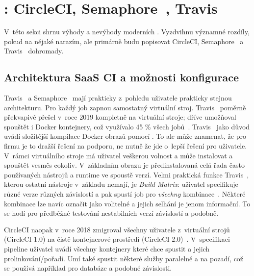 \newcommand{\circleci}{\xspace{}CircleCI\xspace}
\newcommand{\travis}{\xspace{}Travis~\glstext{CI}\xspace}
\newcommand{\semaphore}{\xspace{}Semaphore~\xspace}

\section{: \circleci, \semaphore, \travis}
    V~této sekci shrnu výhody a nevýhody moderních  \CI. Vyzdvihnu významné rozdíly, pokud na nějaké narazím, ale primárně budu popisovat \circleci, \semaphore a \travis dohromady.

    \subsection{Architektura SaaS CI a možnosti konfigurace}
        \travis a \semaphore mají prakticky z~pohledu uživatele prakticky stejnou architekturu. Pro každý job zapnou samostatný virtuální stroj. \travis poměrně překvapivě přešel v~roce 2019 kompletně na virtuální stroje; dříve umožňoval spouštět i Docker kontejnery, což využívalo 45 \% všech jobů~\cite{travis-arch}. \travis jako důvod uvádí složitější kompilace Docker obrazů pomocí . To ale může znamenat, že pro firmu je to dražší řešení na podporu, ne nutně že jde o~lepší řešení pro uživatele. V~rámci virtuálního stroje má uživatel veškerou volnost a může instalovat a spouštět vesměs cokoliv. V~základním obrazu je předinstalovaná celá řada často používaných nástrojů a runtime ve spoustě verzí. Velmi praktická funkce \travis, kterou ostatní \CI nástroje v~základu nemají, je \textit{Build Matrix}: uživatel specifikuje různé verze různých závislostí a \CI pak spustí job pro \textit{všechny} kombinace~\cite{travis-build-matrix}. Některé kombinace lze navíc označit jako volitelné a jejich selhání je jenom informační. To se hodí pro předběžné testování nestabilních  verzí závislostí a podobně.

        \circleci naopak v~roce 2018 zmigroval všechny uživatele z~virtuální strojů (\circleci 1.0) na čistě kontejnerové prostředí (\circleci 2.0)~\cite{circle-migration}. V~specifikaci pipeline uživatel uvádí všechny kontejnery které chce spustit a jejich prolinkování/pořadí. Umí také spustit některé služby paralelně a na pozadí, což se používá například pro databáze a podobné závislosti.

